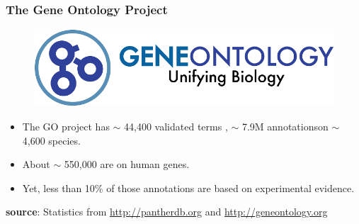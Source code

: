 \documentclass[aspectratio=169, 9pt, handout]{beamer}
\begin{document}
\begin{frame}[label=geneontology]
\frametitle{The Gene Ontology Project}

\begin{figure}
\includegraphics[width=.5\linewidth]{go-logo.png}
\end{figure}
\pause
\begin{itemize}
\item The GO project has $\sim$ 44,400 validated terms \pause \hyperlink{aphylo-goexample}{}, $\sim$ 7.9M annotations\pause on $\sim$ 4,600 species.\pause
\item About $\sim$ 550,000 are on human genes.\pause
\item Yet, less than 10\% of those annotations are based on experimental evidence. %
\end{itemize}

\vfill
\hfill \small \textbf{source}: Statistics from \url{http://pantherdb.org} and \url{http://geneontology.org}\normalsize

\end{frame}
\end{document}

